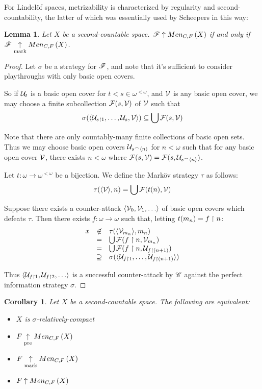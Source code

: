 \documentclass{amsart}
\newtheorem{lemma}[theorem]{Lemma}
\newtheorem{corollary}[theorem]{Corollary}
\theoremstyle{definition}
\begin{document}
For Lindel\"of spaces, metrizability is characterized by regularity and
second-countability, the latter of which was essentially used by Scheepers in
this way:

\begin{lemma}
  Let \(X\) be a second-countable space. \(\mathscr{F}\uparrow Men_{C,F}\left({X}\right)\) if and only if
  \(\mathscr{F}\underset{\text{mark}}{\uparrow}Men_{C,F}\left({X}\right)\).
\end{lemma}

\begin{proof}
  Let \(\sigma\) be a strategy for \(\mathscr{F}\), and note that
  it's sufficient to consider playthroughs with only basic open covers.

  So if \(\mathcal{U}_t\) is a basic open cover for \(t<s\in\omega^{<\omega}\), and
  \(\mathcal{V}\) is any basic open cover, we may choose a finite subcollection
  \(\mathcal{F}(s,\mathcal{V})\) of \(\mathcal{V}\) such that
  \[
    \sigma(\langle\mathcal{U}_{s\restriction 1},\dots,\mathcal{U}_{s},\mathcal{V}\rangle)
      \subseteq
    \bigcup \mathcal{F}(s,\mathcal{V})
  \]

  Note that there are only countably-many finite collections of basic open sets.
  Thus we may choose basic open covers \(\mathcal{U}_{s{^\frown}\langle n\rangle}\) for \(n<\omega\)
  such that for any basic open cover \(\mathcal{V}\), there exists \(n<\omega\) where
  \(\mathcal{F}(s,\mathcal{V})=\mathcal{F}(s,\mathcal{U}_{s{^\frown}\langle n\rangle})\).

  Let \(t:\omega\to\omega^{<\omega}\) be a bijection. We define the Mark\"ov
  strategy \(\tau\) as follows:
  \[
    \tau(\langle\mathcal{V}\rangle, n)
      =
    \bigcup \mathcal{F}(t(n),\mathcal{V})
  \]

  Suppose there exists a counter-attack \(\<\mc V_0,\mc V_1,\dots\>\) of
  basic open covers which defeats \(\tau\). Then there exists
  \(f:\omega\to\omega\) such that, letting \(t(m_n)=f\restriction n\):
  \[
    \begin{array}{rcl}
    x & \not\in & \tau(\langle\mathcal{V}_{m_n}\rangle,m_n) \\
    & = & \bigcup\mathcal{F}(f\restriction n,\mathcal{V}_{m_n}) \\
    & = & \bigcup\mathcal{F}(f\restriction n,\mathcal{U}_{f\restriction (n+1)}) \\
    & \supseteq & \sigma(\langle\mathcal{U}_{f\restriction 1},\dots,\mathcal{U}_{f\restriction(n+1)}\rangle)
    \end{array}
  \]

  Thus \(\<\mc U_{f\rest 1}, \mc U_{f\rest 2},\dots\>\) is a successful
  counter-attack by \(\mathscr{C}\) against the perfect information strategy \(\sigma\).
\end{proof}

\begin{corollary}
  Let \(X\) be a second-countable space. The following are equivalent:
  \begin{itemize}
    \item \(X\) is \(\sigma\)-relatively-compact
    \item \(F \underset{\text{pre}}{\uparrow} Men_{C,F}\left({X}\right)\)
    \item \(F \underset{\text{mark}}{\uparrow} Men_{C,F}\left({X}\right)\)
    \item \(F \uparrow Men_{C,F}\left({X}\right)\)
  \end{itemize}
\end{corollary}
\end{document}
